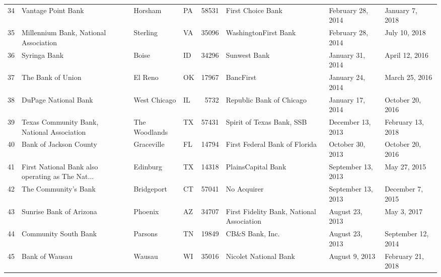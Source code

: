 \begin{tabular}{llllrlll}
34  &                                 Vantage Point Bank &             Horsham &  PA &  58531 &                                  First Choice Bank &   February 28, 2014 &     January 7, 2018 \\
35  &              Millennium Bank, National Association &            Sterling &  VA &  35096 &                               WashingtonFirst Bank &   February 28, 2014 &       July 10, 2018 \\
36  &                                       Syringa Bank &               Boise &  ID &  34296 &                                       Sunwest Bank &    January 31, 2014 &      April 12, 2016 \\
37  &                                  The Bank of Union &             El Reno &  OK &  17967 &                                          BancFirst &    January 24, 2014 &      March 25, 2016 \\
38  &                               DuPage National Bank &        West Chicago &  IL &   5732 &                           Republic Bank of Chicago &    January 17, 2014 &    October 20, 2016 \\
39  &         Texas Community Bank, National Association &       The Woodlands &  TX &  57431 &                          Spirit of Texas Bank, SSB &   December 13, 2013 &   February 13, 2018 \\
40  &                             Bank of Jackson County &          Graceville &  FL &  14794 &                      First Federal Bank of Florida &    October 30, 2013 &    October 20, 2016 \\
41  &  First National Bank also operating as The  Nat... &            Edinburg &  TX &  14318 &                                 PlainsCapital Bank &  September 13, 2013 &        May 27, 2015 \\
42  &                               The Community's Bank &          Bridgeport &  CT &  57041 &                                        No Acquirer &  September 13, 2013 &    December 7, 2015 \\
43  &                            Sunrise Bank of Arizona &             Phoenix &  AZ &  34707 &          First Fidelity Bank, National Association &     August 23, 2013 &         May 3, 2017 \\
44  &                               Community South Bank &             Parsons &  TN &  19849 &                                    CB\&S Bank, Inc. &     August 23, 2013 &  September 12, 2014 \\
45  &                                     Bank of Wausau &              Wausau &  WI &  35016 &                              Nicolet National Bank &      August 9, 2013 &   February 21, 2018 \\

\end{tabular}
